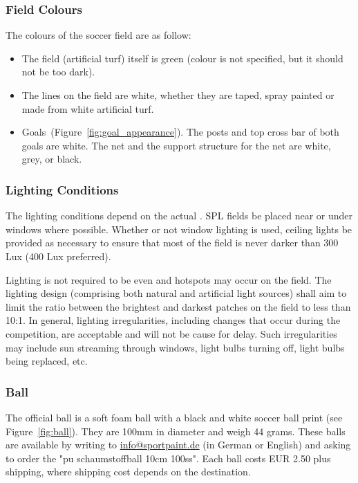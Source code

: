 \subsubsection{Field Colours}
\label{sec:field_colors}
The colours of the soccer field are as follow:

\begin{itemize}
	\item The field (artificial turf) itself is green (colour is not specified, but it should not be too dark).
	
	\item The lines on the field are white, whether they are taped, spray painted or made from white artificial turf.
	
	\item Goals~(\cf Figure~\ref{fig:goal_appearance}). The posts and top cross bar of both goals are white. The net and the support structure for the net are white, grey, or black.
\end{itemize}

\subsubsection{Lighting Conditions}
\label{sec:lightConditions}
The lighting conditions depend on the actual . SPL fields  be placed near or under windows where possible. Whether or not window lighting is used, ceiling lights  be provided as necessary to ensure that most of the field is never darker than 300 Lux (400 Lux preferred). 

Lighting is not required to be even and hotspots may occur on the field. The lighting design (comprising both natural and artificial light sources) shall aim to limit the ratio between the brightest and darkest patches on the field to less than 10:1. In general, lighting irregularities, including changes that occur during the competition, are acceptable and will not be cause for delay. Such irregularities may include sun streaming through windows, light bulbs turning off, light bulbs being replaced, etc.

\subsubsection{Ball}
\label{sec:ball}

The official ball is a soft foam ball with a black and white soccer ball print (see Figure~\ref{fig:ball}). They are 100mm in diameter and weigh 44 grams. These balls are available by writing to \url{info@sportpaint.de} (in German or English) and asking to order the "pu schaumstoffball 10cm 100ss".  Each ball costs EUR 2.50 plus shipping, where shipping cost depends on the destination.

